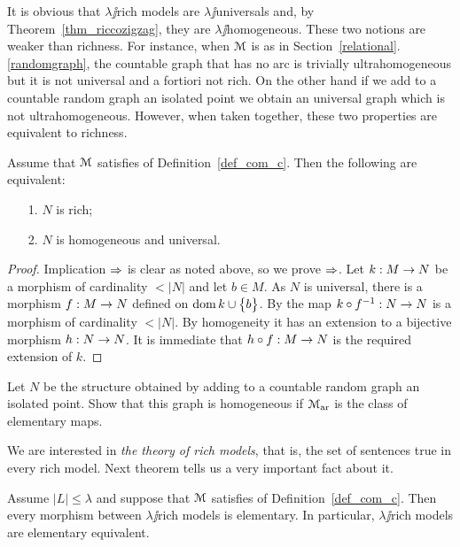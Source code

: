 \documentclass[creche.tex]{subfiles}
\begin{document}
It is obvious that $\lambda\jj$rich models are $\lambda\jj$universals and, by Theorem~\ref{thm_riccozigzag}, they are $\lambda\jj$ho\-mo\-ge\-ne\-ous. These two notions are weaker than richness. For instance, when $\EuScript M$ is as in Section~\ref{relational}.\ref{randomgraph}, the countable graph that has no arc is trivially ultrahomogeneous but it is not universal and a fortiori not rich. On the other hand if we add to a countable random graph an isolated point we obtain an universal graph which is not ultrahomogeneous. However, when taken together, these two properties are equivalent to richness.

\begin{theorem}\label{ricco<->universaleomogeneo}
Assume that $\EuScript M$ satisfies  of Definition~\ref{def_com_c}. Then the following are equivalent:
\begin{itemize}
\item[1.] $N$ is rich;
\item[2.] $N$ is homogeneous and universal.
\end{itemize}
\end{theorem}
\begin{proof} 
Implication $\Rightarrow$ is clear as noted above, so we prove $\Rightarrow$. Let $k:M\rightarrow N$ be a morphism of cardinality $<|N|$ and let $b\in M$. As $N$ is universal, there is a morphism \hbox{$f:M\rightarrow N$} defined on $\mathop{\rm dom} k\cup\big\{b\big\}$. By  the map $k\circ f^{-1}:N\rightarrow N$ is a morphism of cardinality $<|N|$. By homogeneity it has an extension to a bijective morphism $h:N\rightarrow N$. It is immediate that $h\circ f:M\rightarrow N$ is the required extension of $k$.
\end{proof}

\begin{exercise}
Let $N$ be the structure obtained by adding to a countable random graph an isolated point. Show that this graph is homogeneous if $\EuScript M_{\rm ar}$ is the class of elementary maps.\QED
\end{exercise}

We are interested in \emph{the theory of rich models}, that is, the set of sentences true in every rich model. Next theorem tells us a very important fact about it.





\begin{theorem}\label{thm_morphism_rich_elementary}
Assume $|L|\le\lambda$ and suppose that $\EuScript M$ satisfies  of Definition~\ref{def_com_c}. Then every morphism between $\lambda\jj$rich models is elementary. In particular, $\lambda\jj$rich models are elementary equivalent.
\end{theorem}
\end{document}
